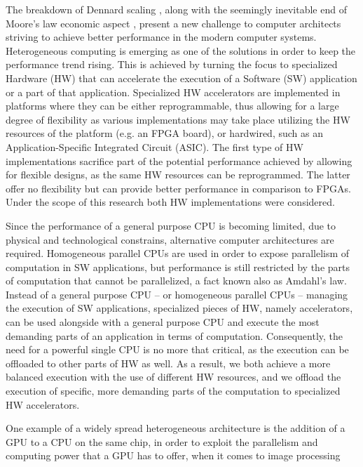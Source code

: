 \documentclass[]{usiinfthesis}
\begin{document}
The breakdown of Dennard scaling \cite{esmaeilzadeh2011dark}, along with the seemingly inevitable 
end of Moore's law economic aspect \cite{simonite2016moore}, present a new challenge to computer 
architects striving to achieve
better performance in the modern computer systems.
Heterogeneous computing is emerging as one of the solutions in order to keep the performance 
trend rising. This is achieved by turning the focus to specialized Hardware (HW) that 
can accelerate the execution of a Software (SW) application or a part of that application. Specialized HW accelerators are implemented in platforms where they can be either reprogrammable, 
thus allowing for a large degree of flexibility as various implementations may take place utilizing
the HW resources of the platform (e.g. an FPGA board), or hardwired, such as an Application-Specific Integrated Circuit (ASIC). The first type of HW implementations sacrifice part of the potential 
performance achieved by allowing for flexible designs, as the same HW resources can be reprogrammed.
The latter offer no flexibility but can provide better performance in comparison to FPGAs. Under 
the scope of this research both HW implementations were considered.  \par
%
%
Since the performance of a general purpose CPU is becoming limited, due to physical and technological 
constrains, alternative computer architectures are required. Homogeneous parallel CPUs are used in 
order to expose parallelism of computation in SW applications, but performance is still restricted 
by the parts of computation that cannot be parallelized, a fact known also as Amdahl's law.
Instead of a 
general purpose CPU -- or homogeneous parallel CPUs -- managing the execution of SW applications, 
specialized pieces
of HW, namely accelerators, can be used alongside with a general purpose CPU and execute the
most demanding parts of an application in terms of computation. Consequently, the need for 
a powerful single CPU is no more that critical, as the execution can be offloaded to other
parts of HW as well. %
As a result, we both achieve a more balanced execution with 
the use of different HW resources, and we offload the execution of specific, more demanding 
parts of the computation to specialized HW accelerators.\par
One example of a widely spread 
heterogeneous architecture is the addition of a GPU to a CPU on the same chip, in order 
to exploit the
parallelism and computing power that a GPU has to offer, when it comes to image processing 
\end{document}
